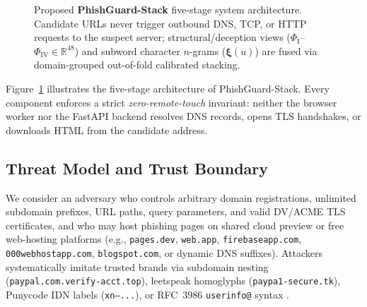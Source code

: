 \documentclass[conference]{IEEEtran}
\begin{document}
\begin{figure}[t]
{%
}
\caption{Proposed \textbf{PhishGuard-Stack} five-stage system architecture. Candidate URLs never trigger outbound DNS, TCP, or HTTP requests to the suspect server; structural/deception views ($\Phi_{\text{I}}$--$\Phi_{\text{IV}} \in \mathbb{R}^{48}$) and subword character $n$-grams ($\boldsymbol{\xi}(u)$) are fused via domain-grouped out-of-fold calibrated stacking.}
\label{fig:arch}
\end{figure}

Figure~\ref{fig:arch} illustrates the five-stage architecture of PhishGuard-Stack. Every component enforces a strict \emph{zero-remote-touch} invariant: neither the browser worker nor the FastAPI backend resolves DNS records, opens TLS handshakes, or downloads HTML from the candidate address.

\subsection{Threat Model and Trust Boundary}
We consider an adversary who controls arbitrary domain registrations, unlimited subdomain prefixes, URL paths, query parameters, and valid DV/ACME TLS certificates, and who may host phishing pages on shared cloud preview or free web-hosting platforms (e.g., \texttt{pages.dev}, \texttt{web.app}, \texttt{firebaseapp.com}, \texttt{000webhostapp.com}, \texttt{blogspot.com}, or dynamic DNS suffixes). Attackers systematically imitate trusted brands via subdomain nesting (\texttt{paypal.com.verify-acct.top}), leetspeak homoglyphs (\texttt{paypa1-secure.tk}), Punycode IDN labels (\texttt{xn--...}), or RFC~3986 \texttt{userinfo@} syntax \cite{rfc3986}.
\end{document}
